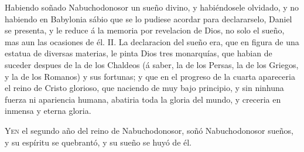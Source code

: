 \bchapter
\pagestyle{scrplain}


\begin{chaptercomment}
Habiendo soñado Nabuchodonosor un sueño divino, y
  habiéndosele olvidado, y no habiendo en Babylonia
  sábio que se lo pudiese acordar para declararselo,
  Daniel se presenta, y le reduce á la memoria por
  revelacion de Dios, no solo el sueño, mas aun las
  ocasiones  de él.  II. La declaracion del sueño era, que
  en figura de una estatua de diversas materias, le
  pinta Dios tres monarquías, que habian de suceder 
  despues de la de los Chaldeos (á saber, la de los Persas,
  la de los Griegos, y la de los Romanos) y sus fortunas;
  y que en el progreso de la cuarta apareceria
  el reino de Cristo glorioso, que naciendo de muy
  bajo principio, y sin ninhuna fuerza ni apariencia 
  humana, abatiria toda la gloria del mundo, y creceria
  en inmensa y eterna gloria.
\end{chaptercomment}

\vspace{\baselineskip}

\bversenonum \lettrine[lines=3,loversize=-0.2,lraise=0.2]{Y}{en} el segundo año del reino de
  Nabuchodonosor, soñó Nabuchodonosor sueños, y su espíritu se
  quebrantó, y su sueño se huyó de él.

